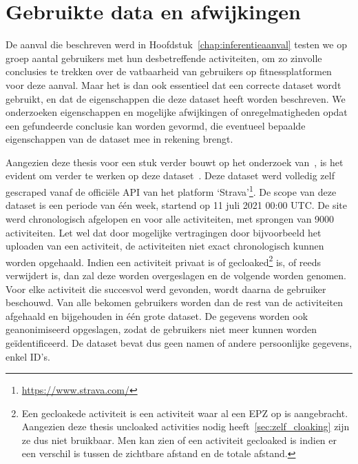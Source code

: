 \chapter{Gebruikte data en afwijkingen}
De aanval die beschreven werd in Hoofdstuk~\ref{chap:inferentieaanval} testen
we op groep aantal gebruikers met hun desbetreffende activiteiten, om zo
zinvolle conclusies te trekken over de vatbaarheid van gebruikers op
fitnessplatformen voor deze aanval. Maar het is dan ook essentieel dat een
correcte dataset wordt gebruikt, en dat de eigenschappen die deze dataset heeft
worden beschreven. We onderzoeken eigenschappen en mogelijke afwijkingen of
onregelmatigheden opdat een gefundeerde conclusie kan worden gevormd, die
eventueel bepaalde eigenschappen van de dataset mee in rekening brengt.

Aangezien deze thesis voor een stuk verder bouwt op het onderzoek
van~\citeauthor{Dhondt}, is het
evident om verder te werken op deze
dataset~\cite{Dhondt}. Deze dataset
werd volledig zelf gescraped vanaf de officiële \ac{API} van het platform
`Strava'\footnote{\url{https://www.strava.com/}}. De scope van deze dataset is
een periode van één week, startend op 11 juli 2021 00:00 \ac{UTC}. De site werd
chronologisch afgelopen en voor alle activiteiten, met sprongen van 9000
activiteiten. Let wel dat door mogelijke vertragingen door bijvoorbeeld het
uploaden van een activiteit, de activiteiten niet exact chronologisch kunnen
worden opgehaald. Indien een activiteit privaat is of gecloaked\footnote{Een
    gecloakede activiteit is een activiteit waar al een EPZ op is aangebracht.
    Aangezien deze thesis uncloaked activities nodig heeft~\ref{sec:zelf_cloaking}
    zijn ze dus niet bruikbaar. Men kan zien of een activiteit gecloaked is indien
    er een verschil is tussen de zichtbare afstand en de totale afstand.} is, of
reeds verwijdert is, dan zal deze worden overgeslagen en de volgende worden
genomen. Voor elke activiteit die succesvol werd gevonden, wordt daarna de
gebruiker beschouwd. Van alle bekomen gebruikers worden dan de rest van de
activiteiten afgehaald en bijgehouden in één grote dataset. De gegevens worden
ook geanonimiseerd opgeslagen, zodat de gebruikers niet meer kunnen worden
geïdentificeerd. De dataset bevat dus geen namen of andere persoonlijke
gegevens, enkel ID's.


